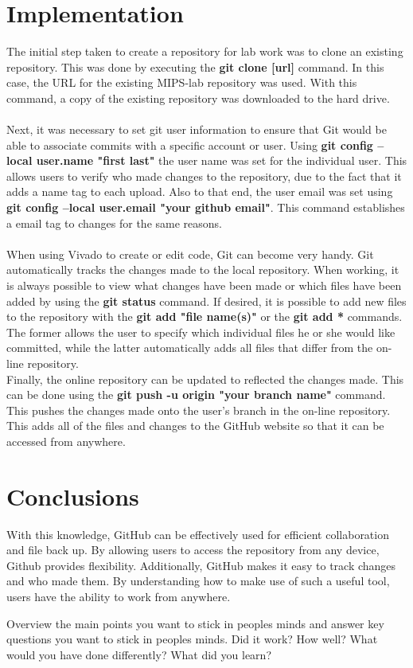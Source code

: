 \documentclass{article}
\begin{document}
\section{Implementation}
The initial step taken to create a repository for lab work was to clone an existing repository. This was done by executing the \textbf{git clone [url]} command. In this case, the URL for the existing MIPS-lab repository was used. With this command, a copy of the existing repository was downloaded to the hard drive. \\
\\
Next, it was necessary to set git user information to ensure that Git would be able to associate commits with a specific account or user. Using \textbf{git config --local user.name "first last"} the user name was set for the individual user. This allows users to verify who made changes to the repository, due to the fact that it adds a name tag to each upload. Also to that end, the user email was set using \textbf{git config --local user.email "your github email"}. This command establishes a email tag to changes for the same reasons.
\\
\\
When using Vivado to create or edit code, Git can become very handy. Git automatically tracks the changes made to the local repository. When working, it is always possible to view what changes have been made or which files have been added by using the \textbf{git status} command. If desired, it is possible to add new files to the repository with the \textbf{git add "file name(s)"} or the \textbf{git add *} commands. The former allows the user to specify which individual files he or she would like committed, while the latter automatically adds all files that differ from the on-line repository.
\\
Finally, the online repository can be updated to reflected the changes made. This can be done using the \textbf{git push -u origin "your branch name"} command. This pushes the changes made onto the user's branch in the on-line repository. This adds all of the files and changes to the GitHub website so that it can be accessed from anywhere.


\section{Conclusions}
With this knowledge, GitHub can be effectively used for efficient collaboration and file back up. By allowing users to access the repository from any device, Github provides flexibility. Additionally, GitHub makes it easy to track changes and who made them. By understanding how to make use of such a useful tool, users have the ability to work from anywhere.

Overview the main points you want to stick in peoples minds and answer key questions you want to stick in peoples minds.  Did it work?  How well? What would you have done differently?  What did you learn?
\end{document}
